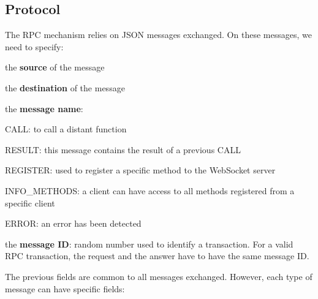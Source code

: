 \documentclass[pdftex,10pt,a4paper]{report}
\newenvironment{packed_item}{
\begin{itemize}
  \setlength{\itemsep}{1pt}
  \setlength{\parskip}{0pt}
  \setlength{\parsep}{0pt}
}{\end{itemize}}
\begin{document}
\subsection{Protocol}
The RPC mechanism relies on JSON messages exchanged. On these messages, we need to specify:
\begin{packed_item}
	\item the \textbf{source} of the message
	\item the \textbf{destination} of the message
	\item the \textbf{message name}:
		\begin{packed_item}
			\item CALL: to call a distant function
			\item RESULT: this message contains the result of a previous CALL
			\item REGISTER: used to register a specific method to the WebSocket server
			\item INFO\_METHODS: a client can have access to all methods registered from a specific client
			\item ERROR: an error has been detected
		\end{packed_item}
	\item the \textbf{message ID}: random number used to identify a transaction. For a valid RPC transaction, the request and the answer have to have the same message ID.
\end{packed_item}

The previous fields are common to all messages exchanged. However, each type of message can have specific fields:
\end{document}
